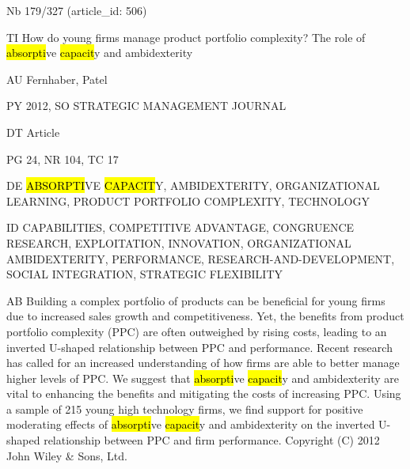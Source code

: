 \documentclass[a4paper]{article}
\begin{document}
\vspace*{-2cm}
Nb \tabto{0cm}179/327 (article\_id: 506)\par
TI \tabto{0cm}How do young firms manage product portfolio complexity? The role of \hl{absorpti}ve \hl{capacit}y and ambidexterity\par
AU \tabto{0cm}Fernhaber, Patel\par
PY \tabto{0cm}2012, SO STRATEGIC MANAGEMENT JOURNAL\par
DT \tabto{0cm}Article\par
PG \tabto{0cm}24, NR 104, TC 17\par
DE \tabto{0cm}\hl{ABSORPTI}VE \hl{CAPACIT}Y, AMBIDEXTERITY, ORGANIZATIONAL LEARNING, PRODUCT PORTFOLIO COMPLEXITY, TECHNOLOGY\par
ID \tabto{0cm}CAPABILITIES, COMPETITIVE ADVANTAGE, CONGRUENCE RESEARCH, EXPLOITATION, INNOVATION, ORGANIZATIONAL AMBIDEXTERITY, PERFORMANCE, RESEARCH-AND-DEVELOPMENT, SOCIAL INTEGRATION, STRATEGIC FLEXIBILITY\par
AB \tabto{0cm}Building a complex portfolio of products can be beneficial for young firms due to increased sales growth and competitiveness. Yet, the benefits from product portfolio complexity (PPC) are often outweighed by rising costs, leading to an inverted U-shaped relationship between PPC and performance. Recent research has called for an increased understanding of how firms are able to better manage higher levels of PPC. We suggest that \hl{absorpti}ve \hl{capacit}y and ambidexterity are vital to enhancing the benefits and mitigating the costs of increasing PPC. Using a sample of 215 young high technology firms, we find support for positive moderating effects of \hl{absorpti}ve \hl{capacit}y and ambidexterity on the inverted U-shaped relationship between PPC and firm performance. Copyright (C) 2012 John Wiley \& Sons, Ltd.\par
\clearpage
\end{document}
